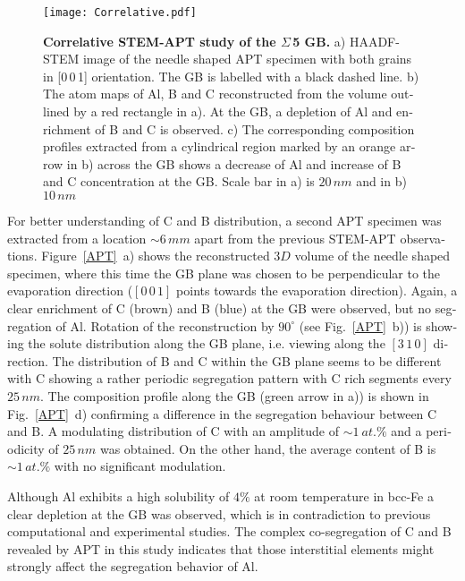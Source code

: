 \documentclass[12pt,a4paper,twoside,twocolumn,english,english]{article}
\begin{document}
\begin{otherlanguage}{english}
 \begin{figure*}[htbp]
  \texttt{[image: Correlative.pdf]}
\caption{\textbf{Correlative STEM-APT study of the $\Sigma$\,5 GB.} a) HAADF-STEM image of the needle shaped APT specimen with both grains in [0\,0\,1] orientation. The GB is labelled with a black dashed line. b) The atom maps of Al, B and C reconstructed from the volume outlined by a red rectangle in a). At the GB, a depletion of Al and enrichment of B and C is observed. c) The corresponding composition profiles extracted from a cylindrical region marked by an orange arrow in b) across the GB shows a decrease of Al and increase of B and C concentration at the GB. Scale bar in a) is $20\,nm$ and in b) $10\,nm$}
\label{correlative}
\end{figure*}
 
For better understanding of C and B distribution, a second APT specimen was extracted from a location $\sim 6\,mm $ apart from the previous STEM-APT observations. Figure~\ref{APT}~a) shows the reconstructed $3D$ volume of the needle shaped specimen, where this time the GB plane was chosen to be perpendicular to the evaporation direction ($[0\,0\,1]$ points towards the evaporation direction). Again, a clear enrichment of C (brown) and B (blue) at the GB were observed, but no segregation of Al. Rotation  of the reconstruction by $90^\circ$ (see Fig.~\ref{APT}~b)) is showing the solute distribution along the GB plane, i.e. viewing along the $[3\,1\,0]$ direction. The distribution of B and C within the GB plane seems to be different with C showing a rather periodic segregation pattern with C rich segments every $25\,nm$. The composition profile along the GB (green arrow in a)) is shown in Fig.~\ref{APT}~d) confirming a difference in the segregation behaviour between C and B. A modulating distribution of C with an amplitude of $\sim 1~at.\%$ and a periodicity of $25\,nm$ was obtained. On the other hand, the average content of B is $\sim 1 \,at.\%$ with no significant modulation.
 
 Although Al exhibits a high solubility of $4\%$ at room temperature in bcc-Fe \cite{kubaschewski_ironbinary_2013} a clear depletion at the GB was observed, which is in contradiction to previous computational \cite{yuasa_first-principles_2013, geng_influence_2001, scheiber2020solute} and experimental \cite{lejcek_solute_2004, mintz_hot-ductility_1979-1} studies. The complex co-segregation of C and B revealed by APT in this study indicates that those interstitial elements might strongly affect the segregation behavior of Al.  
 

\end{otherlanguage}
\end{document}
